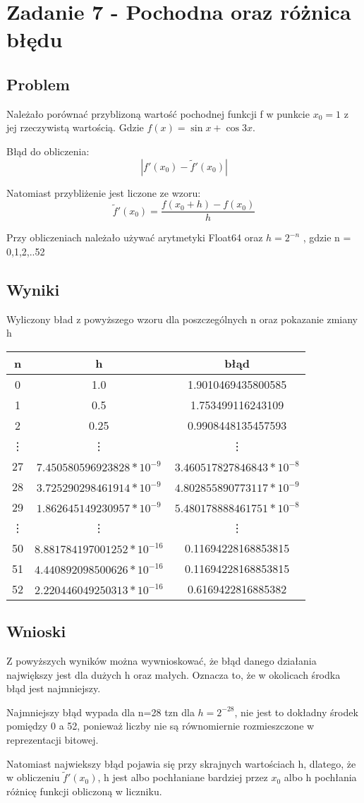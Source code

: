 \documentclass[12pt, a4paper]{article}
\begin{document}
\section{Zadanie 7 - Pochodna oraz różnica błędu}
\subsection{Problem}
Należało porównać przyblizoną wartość pochodnej funkcji f  w punkcie $x_{0} = 1$ z jej rzeczywistą wartością. Gdzie $f(x) = \sin{x} + \cos{3x}$.

 Błąd do obliczenia:
\[|f'(x_{0}) - \widetilde{f}'(x_{0})|\]

Natomiast przybliżenie jest liczone ze wzoru:
\[\widetilde{f}'(x_{0}) = \frac{f(x_{0} + h) - f(x_{0})}{h}\]

Przy obliczeniach należało używać arytmetyki Float64 oraz $h = 2^{-n}$ , gdzie n = 0,1,2,..52
\subsection{Wyniki}
Wyliczony bład z powyższego wzoru dla poszczególnych n oraz pokazanie zmiany h
\begin{center}
  \begin{tabular}{c|c|c}
    n & h & błąd  \\
    \hline
    0 & 1.0 & 1.9010469435800585\\
    1 & 0.5 & 1.753499116243109\\
    2 & 0.25 & 0.9908448135457593\\
    \vdots \qquad & \vdots \qquad & \vdots \qquad \\
    27 & $7.450580596923828 * 10^{-9}$ & $3.460517827846843 * 10^{-8}$\\
    28 & $3.725290298461914 * 10^{-9}$ & $4.802855890773117 * 10^{-9}$\\
    29 & $1.862645149230957 * 10^{-9}$ & $5.480178888461751 * 10^{-8}$\\
    \vdots \qquad & \vdots \qquad & \vdots \qquad \\
    50 & $8.881784197001252 * 10^{-16}$ & 0.11694228168853815\\
    51 & $4.440892098500626 * 10^{-16}$ & 0.11694228168853815\\
    52 & $2.220446049250313 * 10^{-16}$ & 0.6169422816885382
  \end{tabular}
\end{center}
\subsection{Wnioski}
Z powyższych wyników można wywnioskować, że błąd danego działania największy jest dla dużych h oraz małych. Oznacza to, że w okolicach środka błąd jest najmniejszy.

Najmniejszy błąd wypada dla n=28 tzn dla $h=2^{-28}$, nie jest to dokładny środek pomiędzy 0 a 52, ponieważ liczby nie są równomiernie rozmieszczone w reprezentacji bitowej.

Natomiast najwiekszy błąd pojawia się przy skrajnych wartościach h, dlatego, że w obliczeniu $\widetilde{f}'(x_{0})$, h jest albo pochłaniane bardziej przez $x_{0}$ albo h pochłania różnicę funkcji obliczoną w liczniku.
\end{document}
